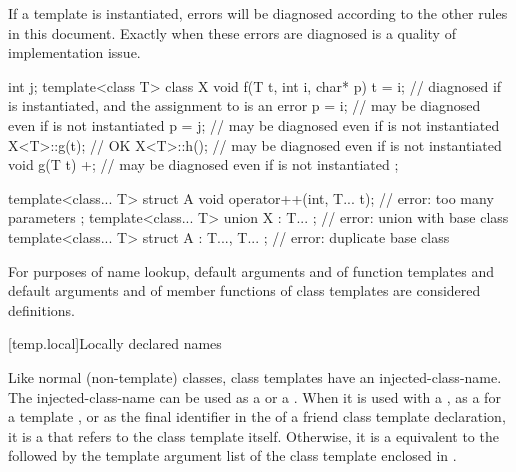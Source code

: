\begin{note}
If a template is instantiated, errors will be diagnosed according
to the other rules in this document.
Exactly when these errors are diagnosed is a quality of implementation issue.
\end{note}
\begin{example}
\begin{codeblock}
int j;
template<class T> class X {
  void f(T t, int i, char* p) {
    t = i;          // diagnosed if  is instantiated, and the assignment to  is an error
    p = i;          // may be diagnosed even if  is not instantiated
    p = j;          // may be diagnosed even if  is not instantiated
    X<T>::g(t);     // OK
    X<T>::h();      // may be diagnosed even if  is not instantiated
  }
  void g(T t) {
    +;              // may be diagnosed even if  is not instantiated
  }
};

template<class... T> struct A {
  void operator++(int, T... t);                     // error: too many parameters
};
template<class... T> union X : T... { };            // error: union with base class
template<class... T> struct A : T...,  T... { };    // error: duplicate base class
\end{codeblock}
\end{example}

\pnum
\begin{note}
For purposes of name lookup, default arguments and
 of function templates and default
arguments and  of
member functions of class templates are considered definitions.
\end{note}

[temp.local]{Locally declared names}

\pnum
Like normal (non-template) classes, class templates have an
injected-class-name.
The
injected-class-name can be used
as a  or a .
When it is used with a
,
as a  for a template ,
or as the final identifier in the  of
a friend class template declaration,
it is a  that refers to the
class template itself.
Otherwise, it is a 
equivalent to the 
followed by
the template argument list
of the class template
enclosed in \tcode{<>}.

